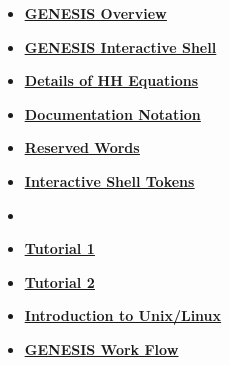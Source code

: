 \documentclass[12pt]{article}
\begin{document}
\begin{itemize}
\item \href{../genesis-overview/genesis-overview.pdf}{\bf \underline{GENESIS Overview}}

\item \href{../gshell/gshell.pdf}{\bf \underline{GENESIS Interactive Shell}}

\item \href{../hh-model-details/hh-model-details.pdf}{\bf \underline{Details of HH Equations}}

\item \href{../notation/notation.pdf}{\bf \underline{Documentation Notation}}

\item \href{../reserved-words/reserved-words.pdf}{\bf \underline{Reserved Words}}

\item \href{../shell-tokens/shell-tokens.pdf}{\bf \underline{Interactive Shell Tokens}}

\item \href{../tutorial-jaeger/tutorial-jaeger.pdf}{\bf \underline{}}

\item \href{../tutorial1/tutorial1.pdf}{\bf \underline{Tutorial 1}}

\item \href{../tutorial2/tutorial2.pdf}{\bf \underline{Tutorial 2}}

\item \href{../unix-linux/unix-linux.pdf}{\bf \underline{Introduction to Unix/Linux}}

\item \href{../work-flow/work-flow.pdf}{\bf \underline{GENESIS Work Flow}}


\end{itemize}

\end{document}
